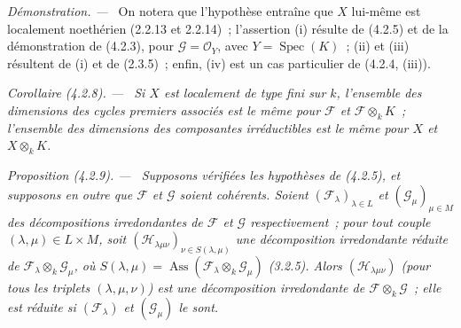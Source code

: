 \documentclass[10pt,oneside]{book}
\newenvironment{proposition}[1][]{%
  \par\medskip\noindent\itshape Proposition (#1). ---\ }{\par}
\newenvironment{corollary}[1][]{%
  \par\medskip\noindent\itshape Corollaire (#1). ---\ }{\par}
\newenvironment{proof}{%
  \par\medskip\noindent\textit{Démonstration. ---\ }}{\par}
\begin{document}
\begin{proof}
On notera que l'hypothèse entraîne que $X$ lui-même est localement noethérien
(2.2.13 et 2.2.14)~; l'assertion (i) résulte de (4.2.5) et de la démonstration
de (4.2.3), pour $\mathcal G=\mathcal O_Y$, avec
$Y=\operatorname{Spec}(K)$~; (ii) et (iii) résultent de (i) et de (2.3.5)~;
enfin, (iv) est un cas particulier de (4.2.4, (iii)).
\end{proof}

\begin{corollary}[4.2.8]
\label{IV.2.4.2.8-fr}
Si $X$ est localement de type fini sur $k$, l'ensemble des dimensions des
cycles premiers associés est le même pour $\mathcal F$ et
$\mathcal F\otimes_k K$~; l'ensemble des dimensions des composantes
irréductibles est le même pour $X$ et $X\otimes_k K$.
\end{corollary}

\begin{proposition}[4.2.9]
\label{IV.2.4.2.9-fr}
Supposons vérifiées les hypothèses de (4.2.5), et supposons en outre que
$\mathcal F$ et $\mathcal G$ soient cohérents. Soient
$(\mathcal F_\lambda)_{\lambda\in L}$ et
$(\mathcal G_\mu)_{\mu\in M}$ des décompositions irredondantes de
$\mathcal F$ et $\mathcal G$ respectivement~; pour tout couple
$(\lambda,\mu)\in L\times M$, soit
$(\mathcal H_{\lambda\mu\nu})_{\nu\in S(\lambda,\mu)}$ une décomposition
irredondante réduite de $\mathcal F_\lambda\otimes_k\mathcal G_\mu$, où
$S(\lambda,\mu)=\operatorname{Ass}(\mathcal F_\lambda\otimes_k\mathcal G_\mu)$
(3.2.5). Alors $(\mathcal H_{\lambda\mu\nu})$ (pour tous les triplets
$(\lambda,\mu,\nu)$) est une décomposition irredondante de
$\mathcal F\otimes_k\mathcal G$~; elle est réduite si
$(\mathcal F_\lambda)$ et $(\mathcal G_\mu)$ le sont.
\end{proposition}
\end{document}
